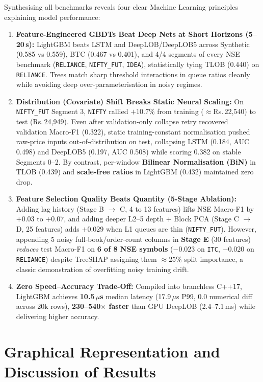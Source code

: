 \documentclass[12pt,a4paper,oneside]{report}
\newcommand{\code}[1]{\texttt{#1}}
\begin{document}
Synthesising all benchmarks reveals four clear Machine Learning principles explaining model performance:
\begin{enumerate}
  \item \textbf{Feature-Engineered GBDTs Beat Deep Nets at Short Horizons (5--20\,s):} LightGBM beats LSTM and DeepLOB/DeepLOB5 across Synthetic (0.585 vs 0.559), BTC (0.467 vs 0.401), and 4/4 segments of every NSE benchmark (\code{RELIANCE}, \code{NIFTY\_FUT}, \code{IDEA}), statistically tying TLOB (0.440) on \code{RELIANCE}. Trees match sharp threshold interactions in queue ratios cleanly while avoiding deep over-parameterisation in noisy regimes.
  \item \textbf{Distribution (Covariate) Shift Breaks Static Neural Scaling:} On \code{NIFTY\_FUT} Segment 3, \code{NIFTY} rallied \textbf{$+10.7\%$} from training ($\approx$Rs.\,22{,}540) to test (Rs.\,24{,}949). Even after validation-only collapse retry recovered validation Macro-F1 (0.322), static training-constant normalisation pushed raw-price inputs out-of-distribution on test, collapsing LSTM (0.184, AUC 0.498) and DeepLOB5 (0.197, AUC 0.508) while scoring 0.382 on stable Segments 0--2. By contrast, per-window \textbf{Bilinear Normalisation (BiN)} in TLOB (0.439) and \textbf{scale-free ratios} in LightGBM (0.432) maintained zero drop.
  \item \textbf{Feature Selection Quality Beats Quantity (5-Stage Ablation):} Adding lag history (Stage B $\to$ C, 4 to 13 features) lifts NSE Macro-F1 by $+0.03$ to $+0.07$, and adding deeper L2--5 depth + Block PCA (Stage C $\to$ D, 25 features) adds $+0.029$ when L1 queues are thin (\code{NIFTY\_FUT}). However, appending 5 noisy full-book/order-count columns in \textbf{Stage E} (30 features) \emph{reduces} test Macro-F1 on \textbf{6 of 8 NSE symbols} ($-0.023$ on \code{ITC}, $-0.020$ on \code{RELIANCE}) despite TreeSHAP assigning them $\approx 25\%$ split importance, a classic demonstration of overfitting noisy training drift.
  \item \textbf{Zero Speed--Accuracy Trade-Off:} Compiled into branchless C++17, LightGBM achieves \textbf{10.5\,$\mu$s} median latency (17.9\,$\mu$s P99, 0.0 numerical diff across 20k rows), \textbf{230--540$\times$ faster} than GPU DeepLOB (2.4--7.1\,ms) while delivering higher accuracy.
\end{enumerate}

\section{Graphical Representation and Discussion of Results}
\end{document}
